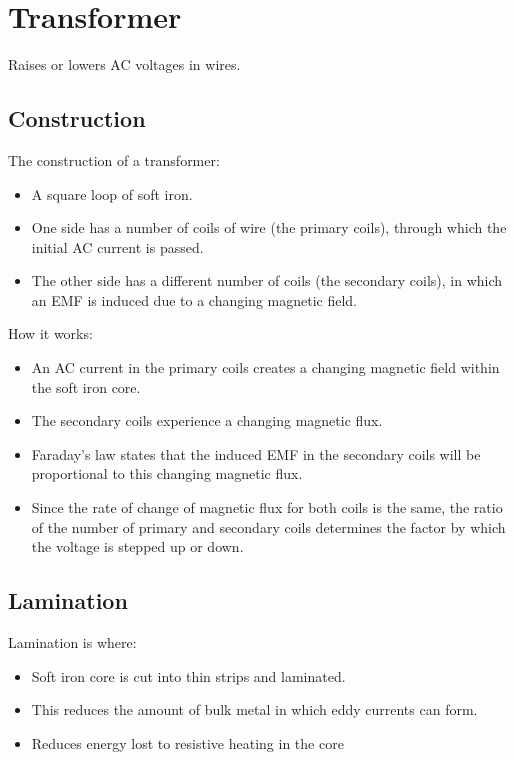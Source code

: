 \documentclass[a4paper,11pt]{report}
\begin{document}
\section{Transformer}

Raises or lowers AC voltages in wires.

\subsection{Construction}

The construction of a transformer:

\begin{itemize}
\item A square loop of soft iron.
\item One side has a number of coils of wire (the primary coils), through which
	the initial AC current is passed.
\item The other side has a different number of coils (the secondary coils),
	in which an EMF is induced due to a changing magnetic field.
\end{itemize}

How it works:

\begin{itemize}
\item An AC current in the primary coils creates a changing magnetic field
	within the soft iron core.
\item The secondary coils experience a changing magnetic flux.
\item Faraday's law states that the induced EMF in the secondary coils will be
	proportional to this changing magnetic flux.
\item Since the rate of change of magnetic flux for both coils is the same,
	the ratio of the number of primary and secondary coils determines the
	factor by which the voltage is stepped up or down.
\end{itemize}

\subsection{Lamination}

Lamination is where:

\begin{itemize}
\item Soft iron core is cut into thin strips and laminated.
\item This reduces the amount of bulk metal in which eddy currents can form.
\item Reduces energy lost to resistive heating in the core
\end{itemize}
\end{document}
